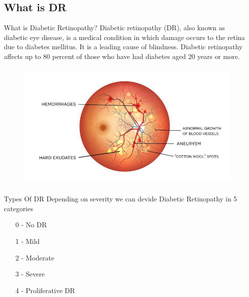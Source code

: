 \documentclass[10pt]{beamer}
\begin{document}
		\subsection{What is DR}
			\begin{frame}{What is Diabetic Retinopathy?}
			Diabetic retinopathy (DR), also known as diabetic eye disease, is a medical condition in which damage occurs to the retina 					due to diabetes mellitus. It is a leading cause of blindness. Diabetic retinopathy affects up to 80 percent of those who have 			had diabetes aged 20 years or more. 
			\begin{figure}
				\includegraphics[width=\linewidth,height=2.5in]{images/DR}
			\end{figure}
			\end{frame}
			\begin{frame}{Types Of DR}
			Depending on severity we can devide Diabetic Retinopathy in 5 categories
			\begin{itemize}
			\item[0] - No DR

			\item[1]- Mild

			\item[2]- Moderate

			\item[3]- Severe

			\item[4]- Proliferative DR
			\end{itemize}
			
			\end{frame}
		
\end{document}
